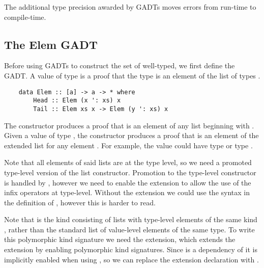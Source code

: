 The additional type precision awarded by GADTs moves errors from run-time to compile-time.


\subsection{The Elem GADT}

Before using GADTs to construct the set of well-typed, we first define the  GADT. A value of type  is a proof that the type  is an element of the list of types . 

\begin{lstlisting}
    data Elem :: [a] -> a -> * where
        Head :: Elem (x ': xs) x
        Tail :: Elem xs x -> Elem (y ': xs) x
\end{lstlisting}
\cite{GADTs}

The  constructor produces a proof that  is an element of any list beginning with . Given a value of type , the  constructor produces a proof that  is an element of the extended list  for any element . For example, the value  could have type  or type . 

Note that all elements of said lists are at the type level, so we need a promoted type-level version of the \code{(:)} list constructor. Promotion to the type-level constructor  is handled by , however we need to enable the  extension to allow the use of the infix operators at type-level. Without the  extension we could use the syntax  in the definition of , however this is harder to read.

Note that \code{[a]} is the kind consisting of lists with type-level elements of the same kind , rather than the standard list of value-level elements of the same type. To write this polymorphic kind signature we need the  extension, which extends the  extension by enabling polymorphic kind signatures. Since  is a dependency of  it is implicitly enabled when using , so we can replace the  extension declaration with .


